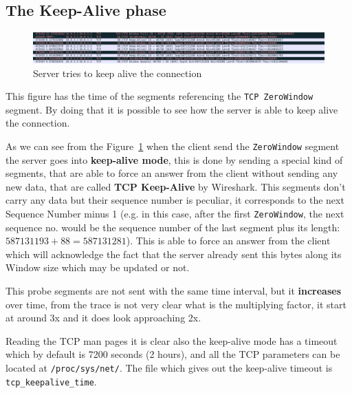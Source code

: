 \documentclass{exam}
\begin{document}
\subsection{The Keep-Alive phase}\label{ssec:the-keep-alive-problem}
\begin{figure}[H]
    \centering
    \includegraphics[width=1\textwidth]{keep-alive.png}
    \caption{Server tries to keep alive the connection}
    \label{fig:keep-alive}
\end{figure}
This figure has the time of the segments referencing the \texttt{TCP ZeroWindow} segment. By doing that it is possible to see how the server is able to keep alive the connection.

As we can see from the Figure~\ref{fig:keep-alive} when the client send the \texttt{ZeroWindow} segment the server goes into \textbf{keep-alive mode}, this is done by sending a special kind of segments, that are able to force an answer from the client without sending any new data, that are called \textbf{TCP Keep-Alive} by Wireshark. This segments don't carry any data but their sequence number is peculiar, it corresponds to the next Sequence Number minus 1 (e.g. in this case, after the first \verb|ZeroWindow|, the next sequence no. would be the sequence number of the last segment plus its length: $587131193 + 88 = 587131281$). This is able to force an answer from the client which will acknowledge the fact that the server already sent this bytes along its Window size which may be updated or not.

This probe segments are not sent with the same time interval, but it \textbf{increases} over time, from the trace is not very clear what is the multiplying factor, it start at around 3x and it does look approaching 2x.  

Reading the TCP man pages it is clear also the keep-alive mode has a timeout which by default is 7200 seconds (2 hours), and all the TCP parameters can be located at \verb|/proc/sys/net/|. The file which gives out the keep-alive timeout is \verb|tcp_keepalive_time|.
\end{document}
